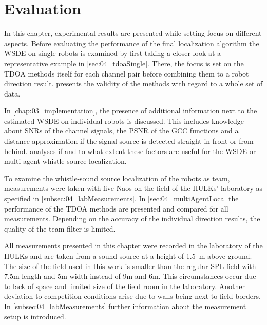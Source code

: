 \chapter{Evaluation}
\label{chap:04_evaluation}

In this chapter, experimental results are presented while setting
focus on different aspects.
Before evaluating the performance of the final localization algorithm the
\ac{WSDE} on single robots is examined by first taking a closer look
at a representative example in \cref{sec:04_tdoaSingle}.
There, the focus is set on the \ac{TDOA} methods itself for each channel pair
before combining them to a robot direction result.
 presents the validity of the methods with
regard to a whole set of data.

In \cref{chap:03_implementation}, the presence of additional
information next to the estimated \ac{WSDE} on individual robots
is discussed.
This includes knowledge about \acp{SNR} of the channel signals, the \ac{PSNR}
of the \ac{GCC} functions and a distance approximation if the signal source
is detected straight in front or from behind.
 analyses if and to
what extent these factors are useful for the \ac{WSDE} or multi-agent whistle
source localization.

To examine the whistle-sound source localization of the robots as team,
measurements were taken with five Naos on the field of the HULKs' laboratory
as specified in \cref{subsec:04_labMeasurements}.
In \cref{sec:04_multiAgentLoca} the performance of the \ac{TDOA} methods are presented
and compared for all measurements.
Depending on the accuracy of the individual direction results, the quality
of the team filter is limited.

All measurements presented in this chapter were recorded in the
laboratory of the HULKs and are taken from a sound source at a height of
\SI{1.5}{\meter} above ground.
The size of the field used in this work is smaller than the regular \ac{SPL}
field with 7.5\si{m} length and 5\si{m} width instead of 9\si{\meter} and 6\si{\meter}.
This circumstances occur due to lack of space and limited size of the
field room in the laboratory.
Another deviation to competition conditions arise due to walls being next to field borders.
In \cref{subsec:04_labMeasurements} further information about the measurement setup
is introduced.






